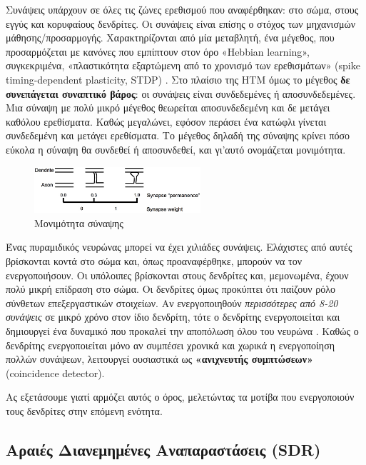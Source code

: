 	Συνάψεις υπάρχουν σε όλες τις ζώνες ερεθισμού που αναφέρθηκαν:
	στο σώμα, στους εγγύς και κορυφαίους δενδρίτες.
	Οι συνάψεις είναι επίσης ο στόχος των μηχανισμών μάθησης/προσαρμογής.
  Χαρακτηρίζονται από μία μεταβλητή, ένα μέγεθος, που προσαρμόζεται με κανόνες που εμπίπτουν στον όρο «Hebbian learning»,
	συγκεκριμένα, «πλαστικότητα εξαρτώμενη από το χρονισμό των ερεθισμάτων» (spike timing-dependent plasticity, STDP) \parencite{songCompetitiveHebbianLearning2000}.
	Στο πλαίσιο της HTM όμως το μέγεθος \textbf{δε συνεπάγεται συναπτικό βάρος}: οι συνάψεις είναι συνδεδεμένες ή αποσυνδεδεμένες.
	Μια σύναψη με πολύ μικρό μέγεθος θεωρείται αποσυνδεδεμένη και δε μετάγει καθόλου ερεθίσματα.
	Καθώς μεγαλώνει, εφόσον περάσει ένα κατώφλι γίνεται συνδεδεμένη και μετάγει ερεθίσματα.
  Το μέγεθος δηλαδή της σύναψης κρίνει πόσο εύκολα η σύναψη θα συνδεθεί ή αποσυνδεθεί, και γι'αυτό ονομάζεται μονιμότητα.

	\begin{figure}
		\centering
		\includegraphics[width=0.55\textwidth]{figures/synapse_permanence}
		\caption[μονιμότητα σύναψης]{Μονιμότητα σύναψης}
		\label{fig:synapse_permanence}
	\end{figure}

	Ένας πυραμιδικός νευρώνας μπορεί να έχει χιλιάδες συνάψεις. Ελάχιστες από αυτές βρίσκονται κοντά στο σώμα και, όπως προαναφέρθηκε, μπορούν να τον ενεργοποιήσουν.
	Οι υπόλοιπες βρίσκονται στους δενδρίτες και, μεμονωμένα, έχουν πολύ μικρή επίδραση στο σώμα.
	Οι δενδρίτες όμως προκύπτει ότι παίζουν ρόλο σύνθετων επεξεργαστικών στοιχείων.
	Αν ενεργοποιηθούν \textit{περισσότερες από 8-20 συνάψεις} σε μικρό χρόνο στον ίδιο δενδρίτη, τότε ο δενδρίτης ενεργοποιείται και δημιουργεί ένα δυναμικό που προκαλεί την αποπόλωση όλου του νευρώνα \parencite{hawkinsWhyNeuronsHave2016}.
  Καθώς ο δενδρίτης ενεργοποιείται μόνο αν συμπέσει χρονικά και χωρικά η ενεργοποίηση πολλών συνάψεων,
	λειτουργεί ουσιαστικά ως \textbf{«ανιχνευτής συμπτώσεων»} (coincidence detector).

  Ας εξετάσουμε γιατί αρμόζει αυτός ο όρος, μελετώντας τα μοτίβα που ενεργοποιούν τους δενδρίτες στην επόμενη ενότητα.

\subsection{Αραιές Διανεμημένες Αναπαραστάσεις (SDR)} \label{htm:sdr}

